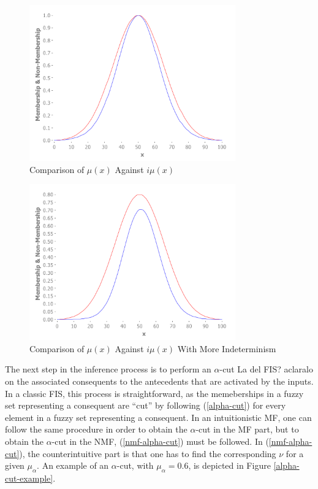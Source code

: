 \documentclass[conference]{IEEEtran}
\begin{document}
\begin{figure}[!t]
  \centering
  \includegraphics[width=3.5in]{if-membership}
  \caption{Comparison of $\mu(x)$ Against $i\mu(x)$}
  \label{if-membership}
\end{figure}

\begin{figure}[!t]
  \centering
  \includegraphics[width=3.5in]{if-membership-drastic}
  \caption{Comparison of $\mu(x)$ Against $i\mu(x)$ With More Indeterminism}
  \label{if-membership-drastic}
\end{figure}

The next step in the inference process is to perform an $\alpha$-cut %
La del FIS? aclaralo on the associated consequents to the antecedents that are
activated by the inputs. In a classic FIS, this process is straightforward, as
the memeberships in a fuzzy set representing a consequent are ``cut'' by
following (\ref{alpha-cut}) for every element in a fuzzy set representing a
consequent. In an intuitionistic MF, one can follow the same procedure in order
to obtain the $\alpha$-cut in the MF part, but to obtain the $\alpha$-cut in
the NMF, (\ref{nmf-alpha-cut}) must be followed. In (\ref{nmf-alpha-cut}), the
counterintuitive part is that one has to find the corresponding $\nu$ for a
given $\mu_{\alpha}$. An example of an $\alpha$-cut, with $\mu_{\alpha} = 0.6$,
is depicted in Figure \ref{alpha-cut-example}.
\end{document}
